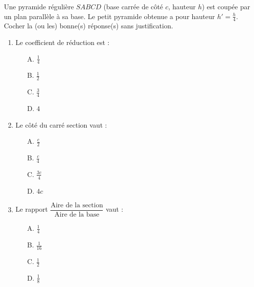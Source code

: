 \documentclass[11pt]{article}
\begin{document}
\begin{exercice}
Une pyramide régulière $SABCD$ (base carrée de côté $c$, hauteur $h$) est coupée par un plan parallèle à sa base. Le petit pyramide obtenue a pour hauteur $h' = \frac{h}{4}$.
Cocher la (ou les) bonne(s) réponse(s) sans justification.
\begin{enumerate}
    \item Le coefficient de réduction est :
    \begin{itemize}
        \item[A.] $\frac{1}{4}$ \quad \item[B.] $\frac{1}{2}$ \quad \item[C.] $\frac{3}{4}$ \quad \item[D.] $4$
    \end{itemize}
    \item Le côté du carré section vaut :
    \begin{itemize}
        \item[A.] $\frac{c}{2}$ \quad \item[B.] $\frac{c}{4}$ \quad \item[C.] $\frac{3c}{4}$ \quad \item[D.] $4c$
    \end{itemize}
    \item Le rapport $\dfrac{\text{Aire de la section}}{\text{Aire de la base}}$ vaut :
    \begin{itemize}
        \item[A.] $\frac{1}{4}$ \quad \item[B.] $\frac{1}{16}$ \quad \item[C.] $\frac{1}{2}$ \quad \item[D.] $\frac{1}{8}$
    \end{itemize}
\end{enumerate}
\end{exercice}
\end{document}
